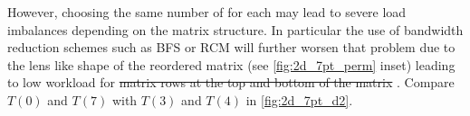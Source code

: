 However, choosing the same number of \levels for each \levelGroup may lead to severe load imbalances depending on the matrix structure. In particular the use of bandwidth reduction schemes such as BFS or RCM  will further worsen that problem due to the lens like shape of the reordered matrix (see \cref{fig:2d_7pt_perm} inset) leading to low workload for \sout{matrix rows at the top and bottom of the matrix} . Compare \eg $T(0)$ and $T(7)$ with  $T(3)$ and $T(4)$ in \cref{fig:2d_7pt_d2}.
  
